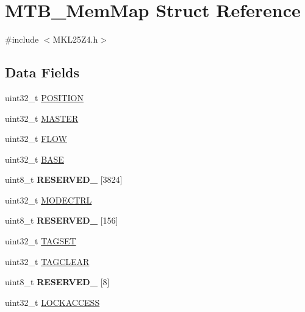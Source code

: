 \hypertarget{struct_m_t_b___mem_map}{}\section{M\+T\+B\+\_\+\+Mem\+Map Struct Reference}
\label{struct_m_t_b___mem_map}


{\ttfamily \#include $<$M\+K\+L25\+Z4.\+h$>$}

\subsection*{Data Fields}
\begin{DoxyCompactItemize}
\item 
uint32\+\_\+t \hyperlink{struct_m_t_b___mem_map_af02973e301b85c6ea0c6ba7520b59173}{P\+O\+S\+I\+T\+I\+ON}
\item 
uint32\+\_\+t \hyperlink{struct_m_t_b___mem_map_a4398e867901c87b7b9d86f7a4730d1c2}{M\+A\+S\+T\+ER}
\item 
uint32\+\_\+t \hyperlink{struct_m_t_b___mem_map_a69ea771a865eb621e80af63894c65982}{F\+L\+OW}
\item 
uint32\+\_\+t \hyperlink{struct_m_t_b___mem_map_a11667e8893e740c2275248dafcc874ed}{B\+A\+SE}
\item 
\mbox{\label{struct_m_t_b___mem_map_a172ff600859c461e34dc403b3a6dc3ed}} 
uint8\+\_\+t {\bfseries R\+E\+S\+E\+R\+V\+E\+D\+\_} \mbox{[}3824\mbox{]}
\item 
uint32\+\_\+t \hyperlink{struct_m_t_b___mem_map_afb3fb2741fa86e77bf0e514f4d4dc96e}{M\+O\+D\+E\+C\+T\+RL}
\item 
\mbox{\label{struct_m_t_b___mem_map_a404eebe408f9386a32efe60d533a89ea}} 
uint8\+\_\+t {\bfseries R\+E\+S\+E\+R\+V\+E\+D\+\_} \mbox{[}156\mbox{]}
\item 
uint32\+\_\+t \hyperlink{struct_m_t_b___mem_map_a5709bb3455f82d56406ad14e3a8c182e}{T\+A\+G\+S\+ET}
\item 
uint32\+\_\+t \hyperlink{struct_m_t_b___mem_map_a341492ac466b6c26b188093417006f72}{T\+A\+G\+C\+L\+E\+AR}
\item 
\mbox{\label{struct_m_t_b___mem_map_a6a9efecd836ca4d1dd3d7058600f042e}} 
uint8\+\_\+t {\bfseries R\+E\+S\+E\+R\+V\+E\+D\+\_} \mbox{[}8\mbox{]}
\item 
uint32\+\_\+t \hyperlink{struct_m_t_b___mem_map_a6fea4948a50a4c0283e2fe15468ddb41}{L\+O\+C\+K\+A\+C\+C\+E\+SS}

\end{DoxyCompactItemize}
